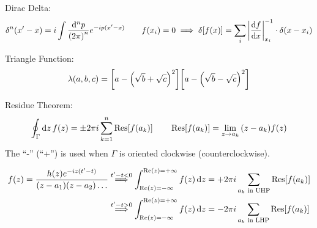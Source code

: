 Dirac Delta:
\begin{equation*}
        \Ddelta[n](x'-x) = i\int\frac{\dd[n]{p}}{\qty(2\pi)^n}e^{-ip(x'-x)}
        \qquad
        f(x_i) = 0
        \implies
        \Ddelta[f(x)] = \sum_{i} \abs{\dv{f}{x}}_{x_i}^{-1}\cdot\Ddelta(x-x_i)
\end{equation*}

Triangle Function:
\begin{equation*}
        \lambda(a,b,c) = \qty[a - \qty(\sqrt{b} + \sqrt{c})^2]\qty[a - \qty(\sqrt{b} - \sqrt{c})^2]
\end{equation*}

Residue Theorem:
\begin{equation*}
        \oint_\Gamma\dd{z} f(z) = \pm2\pi i \sum_{k=1}^n \Res[f(a_k)]
        \qquad
        \Res[f(a_k)] = \lim_{z\to a_k}\qty(z-a_k)f(z)
\end{equation*}
The ``-'' (``+'') is used when $\Gamma$ is oriented clockwise (counterclockwise).

\begin{align*}
        f(z) = \frac{h(z)e^{-iz(t'-t)}}{\qty(z-a_1)\qty(z-a_2)\dots}
        &\stackrel{t'-t<0}{\implies}
        \int_{\Re(z)=-\infty}^{\Re(z)=+\infty}f(z) \dd{z} = + 2\pi i \sum_{a_k\text{ in UHP}}\Res[f(a_k)]
        \\&\stackrel{t'-t>0}{\implies}
        \int_{\Re(z)=-\infty}^{\Re(z)=+\infty}f(z) \dd{z} = - 2\pi i \sum_{a_k\text{ in LHP}}\Res[f(a_k)]
\end{align*}

